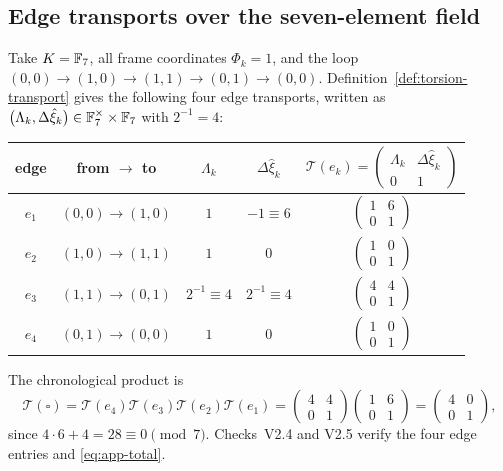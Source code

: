 \subsection{Edge transports over the seven-element field}

Take $K=\mathbb{F}_7$, all frame coordinates $\Phi_k=1$, and the loop
$(0,0)\to(1,0)\to(1,1)\to(0,1)\to(0,0)$.  Definition~\ref{def:torsion-transport}
gives the following four edge transports, written as
$\bigl(\Lambda_k,\Delta\hat\xi_k\bigr)\in\mathbb{F}_7^{\times}\times\mathbb{F}_7$ with
$2^{-1}=4$:

\begin{center}\small
\renewcommand{\arraystretch}{1.25}
\begin{tabular}{@{}ccccc@{}}
\toprule
edge & from $\to$ to & $\Lambda_k$ & $\Delta\hat\xi_k$ &
$\mathcal T(e_k)=\begin{pmatrix}\Lambda_k&\Delta\hat\xi_k\\0&1\end{pmatrix}$ \\
\midrule
$e_1$ & $(0,0)\to(1,0)$ & $1$ & $-1\equiv6$ & $\begin{pmatrix}1&6\\0&1\end{pmatrix}$ \\
$e_2$ & $(1,0)\to(1,1)$ & $1$ & $0$ & $\begin{pmatrix}1&0\\0&1\end{pmatrix}$ \\
$e_3$ & $(1,1)\to(0,1)$ & $2^{-1}\equiv4$ & $2^{-1}\equiv4$
& $\begin{pmatrix}4&4\\0&1\end{pmatrix}$ \\
$e_4$ & $(0,1)\to(0,0)$ & $1$ & $0$ & $\begin{pmatrix}1&0\\0&1\end{pmatrix}$ \\
\bottomrule
\end{tabular}
\end{center}

The chronological product is
\begin{equation}\label{eq:app-total}
  \mathcal T(\square)=\mathcal T(e_4)\mathcal T(e_3)\mathcal T(e_2)\mathcal T(e_1)
  =\begin{pmatrix}4&4\\0&1\end{pmatrix}\begin{pmatrix}1&6\\0&1\end{pmatrix}
  =\begin{pmatrix}4&0\\0&1\end{pmatrix},
\end{equation}
since $4\cdot6+4=28\equiv0\pmod7$.  Checks~V2.4 and V2.5 verify the four edge
entries and \eqref{eq:app-total}.


